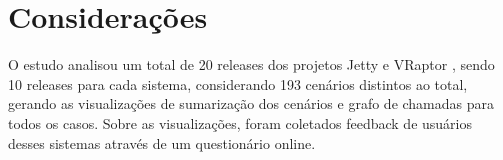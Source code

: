 \section{Considerações} \label{sec:avaliacao-consideracoes}

O estudo analisou um total de 20 releases dos projetos Jetty \cite{Jetty2016} e VRaptor \cite{VRaptor2017}, sendo 10 releases para cada sistema, considerando 193 cenários distintos ao total, gerando as visualizações de sumarização dos cenários e grafo de chamadas para todos os casos. Sobre as visualizações, foram coletados feedback de usuários desses sistemas através de um questionário online.




